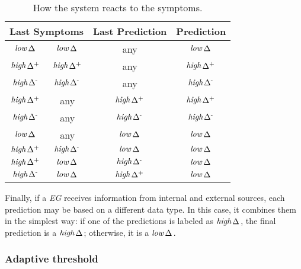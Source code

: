 \documentclass{llncs}
\newcommand{\ourDelta}[2][]{\ensuremath{\Delta\textsuperscript{\text{#1}}
\textsubscript{\text{#2}}}}
\newcommand{\high}[1][ ]{\ensuremath{\text{\emph{high}}#1}}
\newcommand{\low}[1][ ]{\ensuremath{\text{\emph{low}}#1}}
\newcommand{\highDelta}[2][]{\high{\ourDelta[#1]{#2}}}
\newcommand{\lowDelta}[2][]{\low{\ourDelta[#1]{#2}}}
\begin{document}
\begin{table}[h]
 \centering
\begin{tabular}{cccc}
\toprule
\multicolumn{2}{c}{\textbf{Last Symptoms}} & \textbf{Last Prediction} & 
\textbf{Prediction} \\ \midrule

\lowDelta{}         & \lowDelta{}            & any                  
& 
\lowDelta{}           \\ \midrule

\highDelta[+]{}     & \highDelta[+]{}    
  & any                  & \highDelta[+]{} \\ 
\midrule
\highDelta[-]{}     & \highDelta[-]{}    
  & any                  & \highDelta[-]{} \\ 
\midrule

\highDelta[+]{}     & any            & 
\highDelta[+]{} & 
\highDelta[+]{} \\ \midrule

\highDelta[-]{}     & any            & 
\highDelta[-]{} & 
\highDelta[-]{}                 \\ \midrule

\lowDelta{} & any           & \lowDelta{}        
         & \lowDelta{} \\ \midrule

\highDelta[+]{}     & \highDelta[-]{}        
& \lowDelta{}                 & \lowDelta{}                 \\ 
\midrule
         \highDelta[+]{}     & \lowDelta{}            & 
\highDelta[-]{} & \lowDelta{}                 \\ \midrule
\highDelta[-]{}     & \lowDelta{}            & 
\highDelta[+]{} & \lowDelta{}                 \\ \bottomrule
\end{tabular}
\caption{How the system reacts to the symptoms.}
\label{table:system-states}
\end{table}


Finally, if a \emph{EG} receives information from internal and external 
sources, each prediction may be based on a different data type.  In this case, 
it combines them in the simplest way: if one of the predictions is labeled as 
\highDelta{}, the final prediction is a \highDelta{}; otherwise, it is a 
\lowDelta{}.

\subsubsection{Adaptive threshold}
\end{document}
